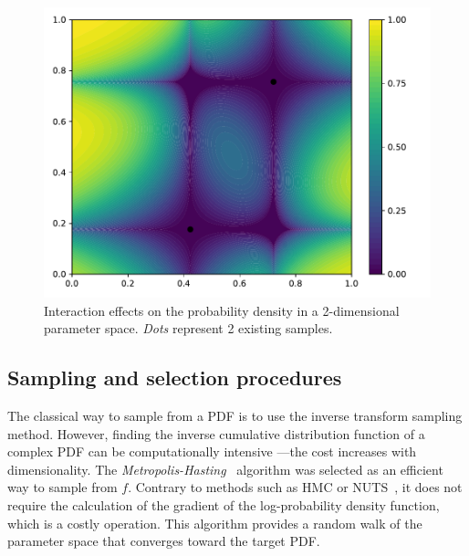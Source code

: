 \cleardoublepage

\begin{figure}[!h]
\centering
\includegraphics[width=0.8\linewidth,keepaspectratio]{fig/contributions/doe/kde_inter.pdf}
\caption{Interaction effects on the probability density in a 2-dimensional parameter space. \emph{Dots} represent 2 existing samples.}
\label{fig:inter_kde}
\end{figure}


\subsection{Sampling and selection procedures}\label{sec:sample}


The classical way to sample from a PDF is to use the inverse transform sampling method. However, finding the inverse cumulative distribution function of a complex PDF can be computationally intensive ---\thinspace the cost increases with dimensionality. The \emph{Metropolis-Hasting}~\citep{Hastings1979} algorithm was selected as an efficient way to sample from $f$. Contrary to methods such as HMC or NUTS~\citep{Hoffman2011}, it does not require the calculation of the gradient of the log-probability density function, which is a costly operation. This algorithm provides a random walk of the parameter space that converges toward the target PDF.



